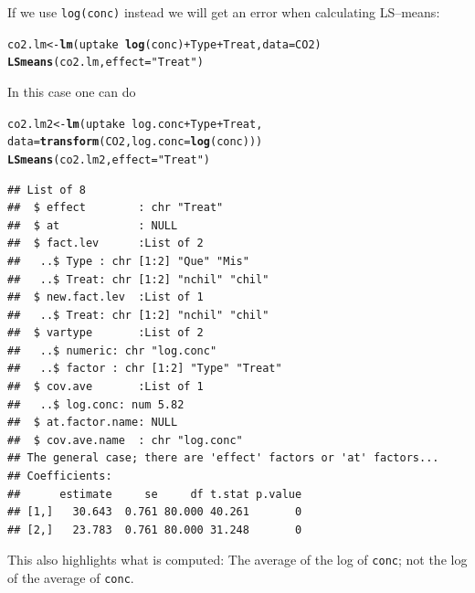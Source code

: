 \documentclass[10pt]{article}\usepackage[]{graphicx}\usepackage[]{color}
\makeatletter
\newcommand{\hlstr}[1]{\textcolor[rgb]{0.192,0.494,0.8}{#1}}%
\newcommand{\hlopt}[1]{\textcolor[rgb]{0,0,0}{#1}}%
\newcommand{\hlstd}[1]{\textcolor[rgb]{0.345,0.345,0.345}{#1}}%
\newcommand{\hlkwb}[1]{\textcolor[rgb]{0.69,0.353,0.396}{#1}}%
\newcommand{\hlkwc}[1]{\textcolor[rgb]{0.333,0.667,0.333}{#1}}%
\newcommand{\hlkwd}[1]{\textcolor[rgb]{0.737,0.353,0.396}{\textbf{#1}}}%
\newenvironment{kframe}{%
 \def\at@end@of@kframe{}%
 \ifinner\ifhmode%
  \def\at@end@of@kframe{\end{minipage}}%
  \begin{minipage}{\columnwidth}%
 \fi\fi%
 \def\FrameCommand##1{\hskip\@totalleftmargin \hskip-\fboxsep
 \colorbox{shadecolor}{##1}\hskip-\fboxsep
     \hskip-\linewidth \hskip-\@totalleftmargin \hskip\columnwidth}%
 \MakeFramed {\advance\hsize-\width
   \@totalleftmargin\z@ \linewidth\hsize
   \@setminipage}}%
 {\par\unskip\endMakeFramed%
 \at@end@of@kframe}
\newenvironment{knitrout}{}{} %
\def\code#1{\texttt{#1}}
\makeatother
\begin{document}
If we use \code{log(conc)} instead we will get an error when
calculating LS--means:
\begin{knitrout}
\color{fgcolor}\begin{kframe}
\begin{alltt}
\hlstd{co2.lm} \hlkwb{<-} \hlkwd{lm}\hlstd{(uptake} \hlopt{~} \hlkwd{log}\hlstd{(conc)} \hlopt{+} \hlstd{Type} \hlopt{+} \hlstd{Treat,} \hlkwc{data}\hlstd{=CO2)}
\hlkwd{LSmeans}\hlstd{(co2.lm,} \hlkwc{effect}\hlstd{=}\hlstr{"Treat"}\hlstd{)}
\end{alltt}
\end{kframe}
\end{knitrout}

In this case one can do
\begin{knitrout}
\color{fgcolor}\begin{kframe}
\begin{alltt}
\hlstd{co2.lm2} \hlkwb{<-} \hlkwd{lm}\hlstd{(uptake} \hlopt{~} \hlstd{log.conc} \hlopt{+} \hlstd{Type} \hlopt{+} \hlstd{Treat,}
             \hlkwc{data}\hlstd{=}\hlkwd{transform}\hlstd{(CO2,} \hlkwc{log.conc}\hlstd{=}\hlkwd{log}\hlstd{(conc)))}
\hlkwd{LSmeans}\hlstd{(co2.lm2,} \hlkwc{effect}\hlstd{=}\hlstr{"Treat"}\hlstd{)}
\end{alltt}
\begin{verbatim}
## List of 8
##  $ effect        : chr "Treat"
##  $ at            : NULL
##  $ fact.lev      :List of 2
##   ..$ Type : chr [1:2] "Que" "Mis"
##   ..$ Treat: chr [1:2] "nchil" "chil"
##  $ new.fact.lev  :List of 1
##   ..$ Treat: chr [1:2] "nchil" "chil"
##  $ vartype       :List of 2
##   ..$ numeric: chr "log.conc"
##   ..$ factor : chr [1:2] "Type" "Treat"
##  $ cov.ave       :List of 1
##   ..$ log.conc: num 5.82
##  $ at.factor.name: NULL
##  $ cov.ave.name  : chr "log.conc"
## The general case; there are 'effect' factors or 'at' factors...
## Coefficients:
##      estimate     se     df t.stat p.value
## [1,]   30.643  0.761 80.000 40.261       0
## [2,]   23.783  0.761 80.000 31.248       0
\end{verbatim}
\end{kframe}
\end{knitrout}
This also highlights what is computed: The average of the log of
\code{conc}; not the log of the average of \code{conc}.
\end{document}
